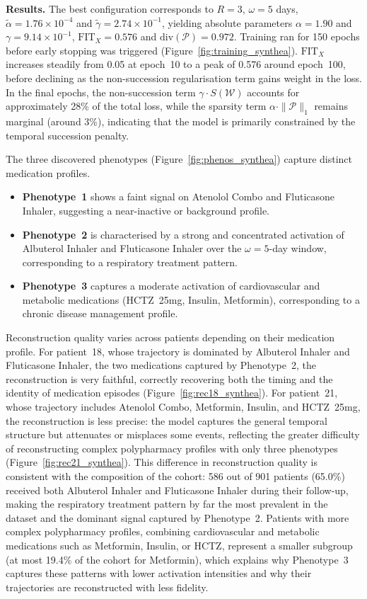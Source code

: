 \documentclass[pdflatex,sn-mathphys-num,referee,lineno]{sn-jnl}
\begin{document}
\textbf{Results.}
The best configuration corresponds to $R = 3$, $\omega = 5$ days, $\tilde{\alpha} = 1.76 \times 10^{-4}$ and $\tilde{\gamma} = 2.74 \times 10^{-1}$, yielding absolute parameters $\alpha = 1.90$ and $\gamma = 9.14 \times 10^{-1}$,
$\text{FIT}_X = 0.576$ and $\text{div}(\mathcal{P}) = 0.972$.
Training ran for 150 epochs before early stopping was triggered (Figure~\ref{fig:training_synthea}).
$\text{FIT}_X$ increases steadily from 0.05 at epoch~10 to a peak of 0.576 around epoch~100, before declining as the non-succession regularisation term gains weight in the loss.
In the final epochs, the non-succession term $\gamma \cdot S(\mathcal{W})$ accounts for approximately 28\% of the total loss, while the sparsity term $\alpha \cdot \|\mathcal{P}\|_1$ remains marginal (around 3\%), indicating that the model is primarily constrained by the temporal succession penalty.

The three discovered phenotypes (Figure~\ref{fig:phenos_synthea}) capture distinct medication profiles.
\begin{itemize}
  \item \textbf{Phenotype~1} shows a faint signal on Atenolol Combo and Fluticasone Inhaler, suggesting a near-inactive or background profile.
  \item \textbf{Phenotype~2} is characterised by a strong and concentrated activation of Albuterol Inhaler and Fluticasone Inhaler over the $\omega = 5$-day window, corresponding to a respiratory treatment pattern.
  \item \textbf{Phenotype~3} captures a moderate activation of cardiovascular and metabolic medications (HCTZ~25mg, Insulin, Metformin), corresponding to a chronic disease management profile.
\end{itemize}

Reconstruction quality varies across patients depending on their medication profile.
For patient~18, whose trajectory is dominated by Albuterol Inhaler and Fluticasone Inhaler, the two medications captured by Phenotype~2, the reconstruction is very faithful, correctly recovering both the timing and the identity of medication episodes (Figure~\ref{fig:rec18_synthea}).
For patient~21, whose trajectory includes Atenolol Combo, Metformin, Insulin, and HCTZ~25mg, the reconstruction is less precise: the model captures the general temporal structure but attenuates or misplaces some events, reflecting the greater difficulty of reconstructing complex polypharmacy profiles with only three phenotypes (Figure~\ref{fig:rec21_synthea}).
This difference in reconstruction quality is consistent with the composition of the cohort: 586 out of 901 patients (65.0\%) received both Albuterol Inhaler and Fluticasone Inhaler during their follow-up, making the respiratory treatment pattern by far the most prevalent in the dataset and the dominant signal captured by Phenotype~2. 
Patients with more complex polypharmacy profiles, combining cardiovascular and metabolic medications such as Metformin, Insulin, or HCTZ, represent a smaller subgroup (at most 19.4\% of the cohort for Metformin), which
explains why Phenotype~3 captures these patterns with lower activation intensities and why their trajectories are reconstructed with less fidelity.
\end{document}
